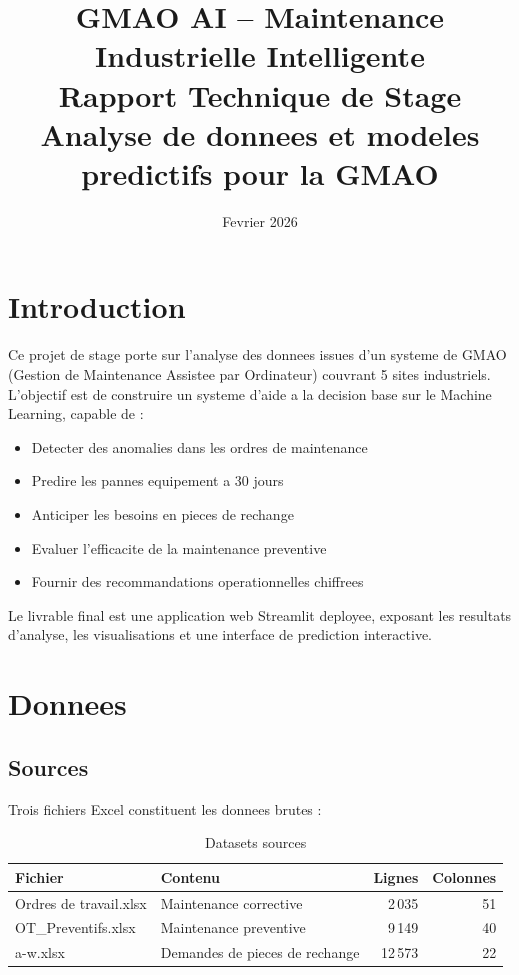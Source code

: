 \documentclass[12pt,a4paper]{article}
\title{
  \vspace{-1cm}
  \textbf{GMAO AI -- Maintenance Industrielle Intelligente} \\[0.3cm]
  \large Rapport Technique de Stage \\[0.2cm]
  \normalsize Analyse de donnees et modeles predictifs pour la GMAO
}
\author{}
\date{Fevrier 2026}
\begin{document}
\maketitle
\thispagestyle{fancy}

\tableofcontents
\newpage

\section{Introduction}

Ce projet de stage porte sur l'analyse des donnees issues d'un systeme de GMAO (Gestion de Maintenance Assistee par Ordinateur) couvrant 5 sites industriels. L'objectif est de construire un systeme d'aide a la decision base sur le Machine Learning, capable de :

\begin{itemize}
  \item Detecter des anomalies dans les ordres de maintenance
  \item Predire les pannes equipement a 30 jours
  \item Anticiper les besoins en pieces de rechange
  \item Evaluer l'efficacite de la maintenance preventive
  \item Fournir des recommandations operationnelles chiffrees
\end{itemize}

Le livrable final est une application web Streamlit deployee, exposant les resultats d'analyse, les visualisations et une interface de prediction interactive.

\section{Donnees}

\subsection{Sources}

Trois fichiers Excel constituent les donnees brutes :

\begin{table}[H]
\centering
\begin{tabular}{llrr}
\toprule
\textbf{Fichier} & \textbf{Contenu} & \textbf{Lignes} & \textbf{Colonnes} \\
\midrule
Ordres de travail.xlsx & Maintenance corrective & 2\,035 & 51 \\
OT\_Preventifs.xlsx & Maintenance preventive & 9\,149 & 40 \\
a-w.xlsx & Demandes de pieces de rechange & 12\,573 & 22 \\
\bottomrule
\end{tabular}
\caption{Datasets sources}
\end{table}
\end{document}
